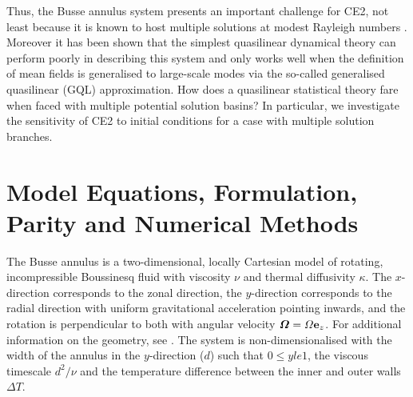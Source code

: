 \documentclass{jfm}
\begin{document}
Thus, the Busse annulus system presents an important challenge for CE2, not least because it is known to host multiple solutions at modest Rayleigh numbers \citep{bh1993}. Moreover it has been shown \citep[][]{tom_2018} that the simplest quasilinear dynamical theory can perform poorly in describing this system and only works well when the definition of mean fields is generalised to large-scale modes via the so-called generalised quasilinear (GQL) approximation. 
How does a quasilinear statistical theory fare when faced with multiple potential solution basins?
In particular, we investigate the sensitivity of CE2 to initial conditions for a case with multiple solution branches.

\section{Model Equations, Formulation, Parity and Numerical Methods}
\label{sec:model-eqations}


The Busse annulus is a two-dimensional, locally Cartesian model of rotating, incompressible Boussinesq fluid with viscosity $\nu$ and thermal diffusivity $\kappa$. The $x$-direction corresponds to the zonal direction, the $y$-direction corresponds to the radial direction with uniform gravitational acceleration pointing inwards, and the rotation is perpendicular to both with angular velocity ${\boldsymbol \Omega = \Omega {\bf e}_z}$. 
For additional information on the geometry, see \citep[][particularly figure 1]{tom_2018}.
The system is non-dimensionalised with the width of the annulus in the $y$-direction ($d$) such that $0 \le y le 1$,  the viscous timescale $d^2/\nu$ and the temperature difference between the inner and outer walls $\Delta T$. 
\end{document}

